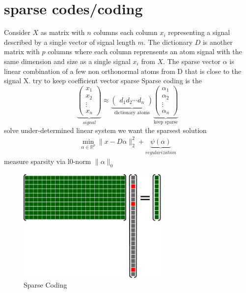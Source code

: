 \section{sparse codes/coding}
Consider $X$ as matrix with $n$ columns each column $x_{i}$ representing a signal described by a single vector of signal length $m$.
The dictionary $D$ is another matrix with $p$ columns where each column reprensents an atom signal with the same dimension and size as a single signal $x_{i}$ from $X$.
The sparse vector $\alpha$ is linear combination of a few non orthonormal atoms from D that is close to the signal X.
try to keep coefficient vector sparse
Sparse coding is the 
\[
\underbrace{\begin{pmatrix} x_1 \\ x_2 \\ \vdots \\ x_n \end{pmatrix}}_{signal} \approx \underbrace{\begin{pmatrix} d_1  d_2 \cdots d_n \end{pmatrix}}_{\textrm{dictionary atoms}}
\underbrace{\begin{pmatrix} \alpha_1 \\ \alpha_2 \\ \vdots \\ \alpha_n \end{pmatrix}}_{\textrm{keep sparse}}
\]
solve under-determined linear system
we want the sparsest solution
\begin{align}
\min_{\alpha\in\mathbb{R}^{p}}  \lVert x - D\alpha \rVert^{2}_{2} + \underbrace{\psi(\alpha)}_{regularization}
\end{align}
measure sparsity via       l0-norm       $\lVert\alpha\rVert_{0}$

\begin{figure}
\centering
\includegraphics[width = 0.66\textwidth]{images/Da_x.pdf} %
\caption{Sparse Coding}
\label{fig:da_x}
\end{figure}


